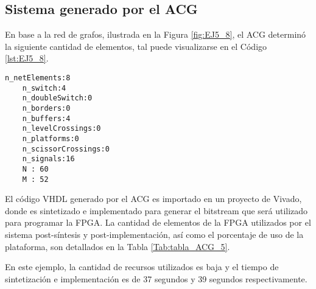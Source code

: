 \subsection{Sistema generado por el ACG}

	En base a la red de grafos, ilustrada en la Figura \ref{fig:EJ5_8}, el ACG determinó la siguiente cantidad de elementos, tal puede visualizarse en el Código \ref{lst:EJ5_8}.
	
	\begin{lstlisting}[language = {}, caption = Cantidad de elementos a implementar por el ACG, label = {lst:EJ5_8}]
	n_netElements:8
	n_switch:4
	n_doubleSwitch:0
	n_borders:0
	n_buffers:4
	n_levelCrossings:0
	n_platforms:0
	n_scissorCrossings:0
	n_signals:16
	N : 60
	M : 52
	\end{lstlisting}
	
	El código VHDL generado por el ACG es importado en un proyecto de Vivado, donde es sintetizado e implementado para generar el bitstream que será utilizado para programar la FPGA. La cantidad de elementos de la FPGA utilizados por el sistema post-síntesis y post-implementación, así como el porcentaje de uso de la plataforma, son detallados en la Tabla \ref{Tab:tabla_ACG_5}.
	
	\begin{table}[H]
		{
			\caption{Síntesis e implementación del ejemplo 5 generado por el ACG.}
			\label{Tab:tabla_ACG_5}
			\centering
			\begin{center}
			\end{center}
		}    
	\end{table}
	
	En este ejemplo, la cantidad de recursos utilizados es baja y el tiempo de sintetización e implementación es de 37 segundos y 39 segundos respectivamente.